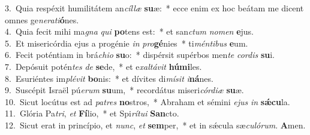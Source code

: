 {3.~}Quia respéxit humilitátem an\textit{cíl}\textit{læ} \textbf{su}æ:~* ecce enim ex hoc beátam me dicent omnes ge\textit{ne}\textit{ra}\textit{ti}\textbf{ó}nes.\\
{4.~}Quia fecit mihi ma\textit{gna} \textit{qui} \textbf{po}tens est:~* et san\textit{ctum} \textit{no}\textit{men} \textbf{e}jus.\\
{5.~}Et misericórdia ejus a progénie \textit{in} \textit{pro}\textbf{gé}nies~* ti\textit{mén}\textit{ti}\textit{bus} \textbf{e}um.\\
{6.~}Fecit poténtiam in brá\textit{chi}\textit{o} \textbf{su}o:~* dispérsit supérbos men\textit{te} \textit{cor}\textit{dis} \textbf{su}i.\\
{7.~}Depósuit potén\textit{tes} \textit{de} \textbf{se}de,~* et e\textit{xal}\textit{tá}\textit{vit} \textbf{hú}\textbf{mi}les.\\
{8.~}Esuriéntes im\textit{plé}\textit{vit} \textbf{bo}nis:~* et dívites di\textit{mí}\textit{sit} \textit{i}\textbf{ná}nes.\\
{9.~}Suscépit Israël pú\textit{e}\textit{rum} \textbf{su}um,~* recordátus miseri\textit{cór}\textit{di}\textit{æ} \textbf{su}æ.\\
{10.~}Sicut locútus est ad \textit{pa}\textit{tres} \textbf{no}stros,~* Abraham et sémini \textit{e}\textit{jus} \textit{in} \textbf{sǽ}\textbf{cu}la.\\
{11.~}Glória Pa\textit{tri}, \textit{et} \textbf{Fí}lio,~* et Spi\textit{rí}\textit{tu}\textit{i} \textbf{San}cto.\\
{12.~}Sicut erat in princípio, et \textit{nunc}, \textit{et} \textbf{sem}per,~* et in sǽcula sæ\textit{cu}\textit{ló}\textit{rum}. \textbf{A}men.\\
